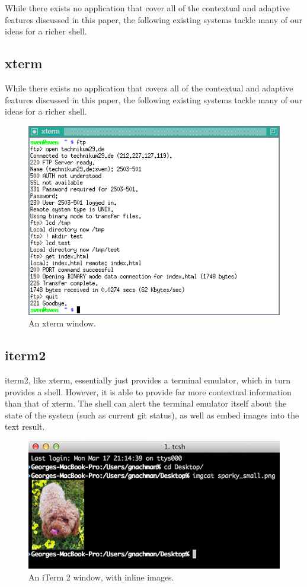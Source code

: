 While there exists no application that cover all of the contextual and adaptive
features discussed in this paper, the following existing systems tackle many of
our ideas for a richer shell.

\subsection{xterm}
While there exists no application that covers all of the contextual and adaptive
features discussed in this paper, the following existing systems tackle many of
our ideas for a richer shell.
\begin{figure}[h]
  \centering
  \includegraphics[width=0.8\linewidth]{figures/existing/xterm.png}
  \caption{An xterm window.}
  \label{fig:xterm}
\end{figure}

\subsection{iterm2}
iterm2, like xterm, essentially just provides a terminal emulator, which in turn
provides a shell. However, it is able to provide far more contextual information
than that of xterm. The shell can alert the terminal emulator itself about the
state of the system (such as current git status), as well as embed images into
the text result.
\begin{figure}[h]
  \centering
  \includegraphics[width=0.8\linewidth]{figures/existing/iterm2.png}
  \caption{An iTerm 2 window, with inline images.}
  \label{fig:iterm}
\end{figure}

